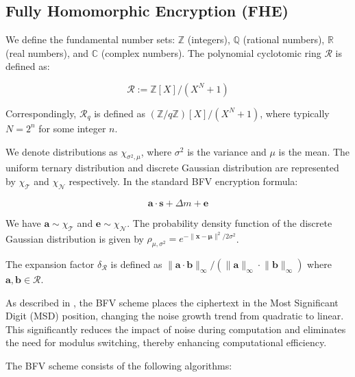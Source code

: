 \documentclass[11pt]{article}
\begin{document}
\subsection{Fully Homomorphic Encryption (FHE)}
\label{sec:BFV}

We define the fundamental number sets: $\mathbb{Z}$ (integers), $\mathbb{Q}$ (rational numbers), $\mathbb{R}$ (real numbers), and $\mathbb{C}$ (complex numbers). The polynomial cyclotomic ring $\mathcal{R}$ is defined as:

$$\mathcal{R}:=\mathbb{Z}[X]/(X^N+1)$$

Correspondingly, $\mathcal{R}_q$ is defined as $(\mathbb{Z}/q\mathbb{Z})[X]/(X^N+1)$, where typically $N=2^n$ for some integer $n$.

We denote distributions as $\chi_{\sigma^2,\mu}$, where $\sigma^2$ is the variance and $\mu$ is the mean. The uniform ternary distribution and discrete Gaussian distribution are represented by $\chi_\mathcal{T}$ and $\chi_\mathcal{N}$ respectively. In the standard BFV encryption formula:

$$\mathbf{a}\cdot \mathbf{s} +\Delta m +\mathbf{e}$$

We have $\mathbf{a}\sim\chi_\mathcal{T}$ and $\mathbf{e}\sim\chi_{\mathcal{N}}$. The probability density function of the discrete Gaussian distribution is given by $\rho_{\mu,\sigma^2}=e^{-\lVert\mathbf{x}-\mathbf{\mu}\rVert^2/2\sigma^2}$.

The expansion factor $\delta_\mathcal{R}$ is defined as $\lVert \mathbf{a}\cdot\mathbf{b}\rVert_\infty/(\lVert\mathbf{a}\rVert_\infty\cdot\lVert\mathbf{b}\rVert_\infty)$ where $\mathbf{a},\mathbf{b}\in \mathcal{R}$.

As described in \cite{10.1007/978-3-642-32009-5_50, cryptoeprint:2012/144}, the BFV scheme places the ciphertext in the Most Significant Digit (MSD) position, changing the noise growth trend from quadratic to linear. This significantly reduces the impact of noise during computation and eliminates the need for modulus switching, thereby enhancing computational efficiency.

The BFV scheme consists of the following algorithms:
\end{document}
